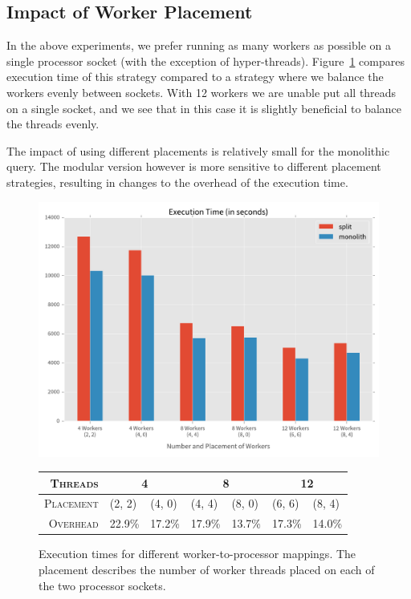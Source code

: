 \subsection{Impact of Worker Placement} \label{sec:evalnuma}

In the above experiments, we prefer running as many workers as possible
on a single processor socket (with the exception of hyper-threads).
Figure~\ref{fig:numa} compares execution time of this strategy compared to a
strategy where we balance the workers evenly between sockets. With 12 workers
we are unable put all threads on a single socket, and we see that in this case
it is slightly beneficial to balance the threads evenly.

The impact of using different placements is relatively small for the
monolithic query. The modular version however is more sensitive to
different placement strategies, resulting in changes to the overhead
of the execution time. 

\begin{figure}[h]
  \centering
    \includegraphics[width=1\textwidth]{figures/evaluation/numa}

    {\footnotesize
    \vspace{1em}
    \begin{tabularx}{\textwidth}{ r|XX|XX|XX }
      \hline 
      \textsc{Threads} & \multicolumn{2}{c|}{4} & \multicolumn{2}{c|}{8} & \multicolumn{2}{c}{12} \\
      \hline 
      \textsc{Placement} & (2, 2)&(4, 0)&(4, 4)&(8, 0)&(6, 6)&(8, 4)\\
      \hline 
      \textsc{Overhead} & 22.9\%&17.2\%&17.9\%&13.7\%&17.3\%&14.0\% \\
      \hline
    \end{tabularx}
    }
    \caption[Execution time for different of worker placement]{Execution times for
    different worker-to-processor mappings. The placement describes the number of
    worker threads placed on each of the two processor sockets.}
    \label{fig:numa}
\end{figure}

